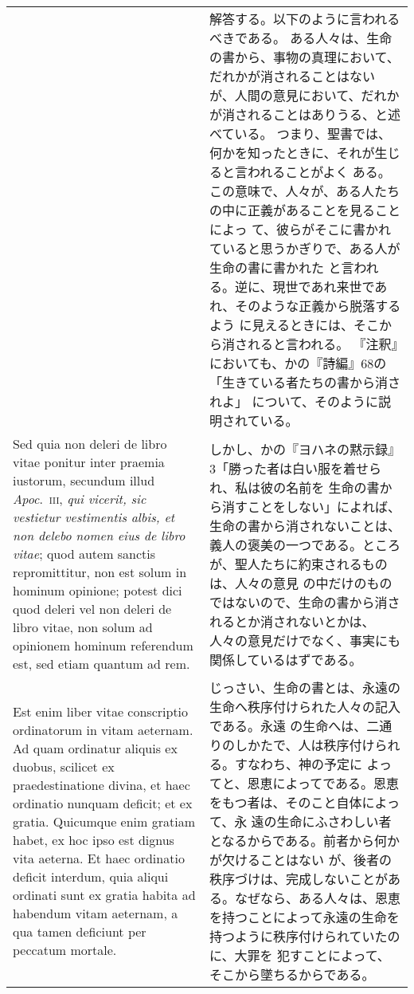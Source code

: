 \documentclass[10pt]{jsarticle} %
\begin{document}
\begin{longtable}{p{21em}p{21em}}
&


解答する。以下のように言われるべきである。
ある人々は、生命の書から、事物の真理において、だれかが消されることはない
 が、人間の意見において、だれかが消されることはありうる、と述べている。
 つまり、聖書では、何かを知ったときに、それが生じると言われることがよく
 ある。この意味で、人々が、ある人たちの中に正義があることを見ることによっ
 て、彼らがそこに書かれていると思うかぎりで、ある人が生命の書に書かれた
 と言われる。逆に、現世であれ来世であれ、そのような正義から脱落するよう
 に見えるときには、そこから消されると言われる。
『注釈』においても、かの『詩編』68の「生きている者たちの書から消されよ」
 について、そのように説明されている。


\\


Sed quia non deleri de libro vitae ponitur inter praemia
iustorum, secundum illud {\itshape Apoc}.~{\scshape iii}, {\itshape qui vicerit, sic vestietur
vestimentis albis, et non delebo nomen eius de libro vitae}; quod autem
sanctis repromittitur, non est solum in hominum opinione; potest dici
quod deleri vel non deleri de libro vitae, non solum ad opinionem
hominum referendum est, sed etiam quantum ad rem. 


&

しかし、かの『ヨハネの黙示録』3「勝った者は白い服を着せられ、私は彼の名前を
 生命の書から消すことをしない」によれば、生命の書から消されないことは、
 義人の褒美の一つである。ところが、聖人たちに約束されるものは、人々の意見
 の中だけのものではないので、生命の書から消されるとか消されないとかは、
 人々の意見だけでなく、事実にも関係しているはずである。

\\


Est enim liber vitae
conscriptio ordinatorum in vitam aeternam. Ad quam ordinatur aliquis ex
duobus, scilicet ex praedestinatione divina, et haec ordinatio nunquam
deficit; et ex gratia. Quicumque enim gratiam habet, ex hoc ipso est
dignus vita aeterna. Et haec ordinatio deficit interdum, quia aliqui
ordinati sunt ex gratia habita ad habendum vitam aeternam, a qua tamen
deficiunt per peccatum mortale. 


&

じっさい、生命の書とは、永遠の生命へ秩序付けられた人々の記入である。永遠
 の生命へは、二通りのしかたで、人は秩序付けられる。すなわち、神の予定に
 よってと、恩恵によってである。恩恵をもつ者は、そのこと自体によって、永
 遠の生命にふさわしい者となるからである。前者から何かが欠けることはない
 が、後者の秩序づけは、完成しないことがある。なぜなら、ある人々は、恩恵
 を持つことによって永遠の生命を持つように秩序付けられていたのに、大罪を
 犯すことによって、そこから墜ちるからである。



\end{longtable}
\end{document}
